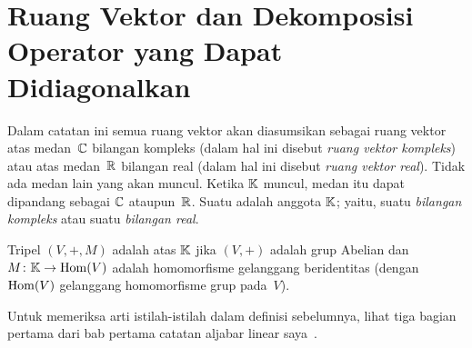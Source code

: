 \section{Ruang Vektor dan Dekomposisi Operator yang Dapat Didiagonalkan}
\begin{conv} Dalam catatan ini semua ruang vektor
akan diasumsikan sebagai ruang vektor atas medan~$\mathbb{C}$ bilangan kompleks (dalam hal ini disebut \emph{ruang vektor kompleks}) atau atas
medan~$\mathbb{R}$ bilangan real (dalam hal ini disebut \emph{ruang vektor real}). Tidak ada medan lain yang akan muncul. Ketika $\mathbb{K}$ muncul, medan itu dapat dipandang
sebagai $\mathbb{C}$ ataupun~$\mathbb{R}$. Suatu
 adalah anggota $\mathbb{K}$; yaitu, suatu \emph{bilangan kompleks} atau suatu \emph{bilangan real}.
\end{conv}

\begin{defn}\label{00001} Tripel $(V,+,M)$ adalah
 atas $\mathbb{K}$ jika $(V,+)$ adalah grup Abelian dan $M\colon \mathbb{K} \rightarrow \operatorname{Hom}(V)$
adalah homomorfisme gelanggang beridentitas (dengan $\operatorname{Hom}(V)$ gelanggang homomorfisme grup
pada~$V$).
\end{defn}

Untuk memeriksa arti istilah-istilah dalam definisi sebelumnya, lihat tiga bagian pertama dari bab pertama catatan
aljabar linear saya~\cite{Erdman:2010}.

